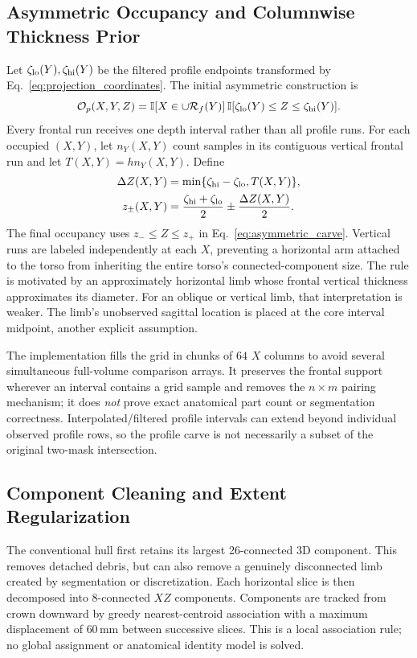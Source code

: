 \subsection{Asymmetric Occupancy and Columnwise Thickness Prior}
Let $\zeta_{\rm lo}(Y),\zeta_{\rm hi}(Y)$ be the filtered profile endpoints transformed by Eq.~\eqref{eq:projection_coordinates}. The initial asymmetric construction is
\begin{equation}
\mathcal O_p(X,Y,Z)=\mathbb I[X\in\cup\mathcal R_f(Y)]\,
\mathbb I[\zeta_{\rm lo}(Y)\le Z\le\zeta_{\rm hi}(Y)].
\label{eq:asymmetric_carve}
\end{equation}
Every frontal run receives one depth interval rather than all profile runs. For each occupied $(X,Y)$, let $n_Y(X,Y)$ count samples in its contiguous vertical frontal run and let $T(X,Y)=hn_Y(X,Y)$. Define
\begin{align}
\Delta Z(X,Y)&=\min\{\zeta_{\rm hi}-\zeta_{\rm lo},T(X,Y)\},\label{eq:depth_narrowing}\\
z_\pm(X,Y)&=\frac{\zeta_{\rm hi}+\zeta_{\rm lo}}{2}\pm\frac{\Delta Z(X,Y)}2.\nonumber
\end{align}
The final occupancy uses $z_-\le Z\le z_+$ in Eq.~\eqref{eq:asymmetric_carve}. Vertical runs are labeled independently at each $X$, preventing a horizontal arm attached to the torso from inheriting the entire torso's connected-component size. The rule is motivated by an approximately horizontal limb whose frontal vertical thickness approximates its diameter. For an oblique or vertical limb, that interpretation is weaker. The limb's unobserved sagittal location is placed at the core interval midpoint, another explicit assumption.

The implementation fills the grid in chunks of $64$ $X$ columns to avoid several simultaneous full-volume comparison arrays. It preserves the frontal support wherever an interval contains a grid sample and removes the $n\times m$ pairing mechanism; it does \emph{not} prove exact anatomical part count or segmentation correctness. Interpolated/filtered profile intervals can extend beyond individual observed profile rows, so the profile carve is not necessarily a subset of the original two-mask intersection.

\subsection{Component Cleaning and Extent Regularization}
\label{subsec:extent_reg}
The conventional hull first retains its largest 26-connected 3D component. This removes detached debris, but can also remove a genuinely disconnected limb created by segmentation or discretization. Each horizontal slice is then decomposed into 8-connected $XZ$ components. Components are tracked from crown downward by greedy nearest-centroid association with a maximum displacement of $60$\,mm between successive slices. This is a local association rule; no global assignment or anatomical identity model is solved.

